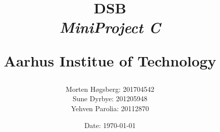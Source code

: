 \newcommand{\authorName}{}
\newcommand{\titleName}{DSB}
\newcommand{\subject}{MiniProject C}
\newcommand{\institute}{Aarhus Institue of Technology}
\begin{titlepage}
  \centering
    \title
    {
      \Huge \textbf{\titleName}\\
      \scale{\numberSQRTTWO}{\vspace{\sol pt}}
      \LARGE \textit{\subject}
      \scale{\numberSQRTTWO}{\rule{\linewidth}{\sol pt}}

      \textbf{\institute}
      \author
    {
      \LARGE Morten Høgsberg: 201704542 \\ \LARGE Sune Dyrbye: 201205948 \\ \LARGE Yehven Parolia: 20112870
    }
      \date{\LARGE Date: \today}
    }
\end{titlepage}

